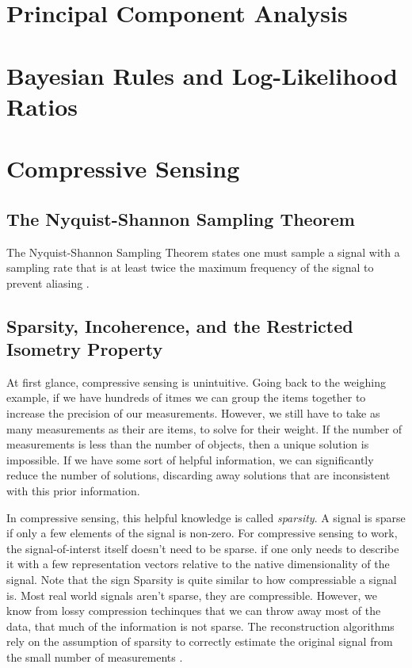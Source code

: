 \section{Principal Component Analysis}

\section{Bayesian Rules and Log-Likelihood Ratios}

\section{Compressive Sensing}



\subsection{The Nyquist-Shannon Sampling Theorem}

The Nyquist-Shannon Sampling Theorem states one must sample a signal with a sampling rate that is at least twice the maximum frequency of the signal to prevent aliasing \cite{shannon1949communication}.


\subsection{Sparsity, Incoherence, and the Restricted Isometry Property}

At first glance, compressive sensing is unintuitive. Going back to the weighing example, if we have hundreds of itmes we can group the items together to increase the precision of our measurements. However, we still have to take as many measurements as their are items, to solve for their weight. If the number of measurements is less than the number of objects, then a unique solution is impossible. If we have some sort of helpful information, we can significantly reduce the number of solutions, discarding away solutions that are inconsistent with this prior information. 

In compressive sensing, this helpful knowledge is called \emph{sparsity}. A signal is sparse if only a few elements of the signal is non-zero. For compressive sensing to work, the signal-of-interst itself doesn't need to be sparse.  if one only needs to describe it with a few representation vectors relative to the native dimensionality of the signal. Note that the sign  Sparsity is quite similar to how compressiable a signal is. Most real world signals aren't sparse, they are compressible. However, we know from lossy compression techinques that we can throw away most of the data, that much of the information is not sparse. The reconstruction algorithms rely on the assumption of sparsity to correctly estimate the original signal from the small number of measurements \cite{}.

